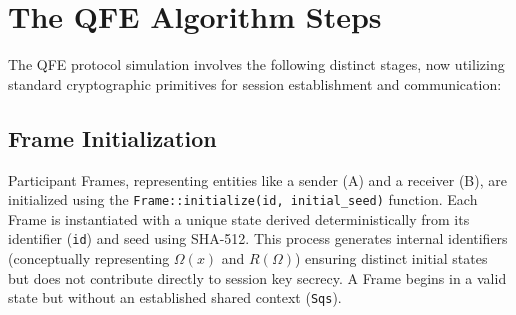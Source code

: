 \documentclass[11pt]{article}
\newcommand{\OmegaFunc}{\Omega(x)}         %
\newcommand{\RFunc}{R(\Omega)}           %
\begin{document}
	
	\section{The QFE Algorithm Steps}
	
	The QFE protocol simulation involves the following distinct stages, now utilizing standard cryptographic primitives for session establishment and communication:
	
	\subsection{Frame Initialization}
	Participant Frames, representing entities like a sender (A) and a receiver (B), are initialized using the \texttt{Frame::initialize(id, initial\_seed)} function. Each Frame is instantiated with a unique state derived deterministically from its identifier (\texttt{id}) and seed using SHA-512. This process generates internal identifiers (conceptually representing $\OmegaFunc$ and $\RFunc$) ensuring distinct initial states but does not contribute directly to session key secrecy. A Frame begins in a valid state but without an established shared context (\texttt{Sqs}).
	
\end{document}
